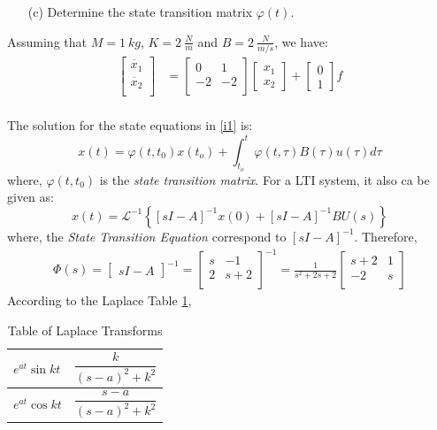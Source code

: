 \documentclass{article}
\begin{document}
\begin{enumerate}[label=(\alpha*)]
\item[(c)] Determine the state transition matrix $\varphi(t)$.
\end{enumerate}

Assuming that $M = 1\:kg$, $K = 2\:\frac{N}{m}$ and $B = 2\:\frac{N}{m/s}$, we have:
\begin{eqnarray*}
\begin{bmatrix} 
	\dot{x_1} \\ 
	\dot{x_2} \\
\end{bmatrix} &= 
\begin{bmatrix} 
    0  &   1 \\
    -2  &  -2\\
\end{bmatrix} 
\begin{bmatrix}
	x_1 \\
	x_2 
\end{bmatrix} +
\begin{bmatrix}
	0 \\ 1
\end{bmatrix}f \\
\end{eqnarray*}

The solution for the state equations in \ref{i1} is:
\begin{equation}
x(t) = \varphi(t,t_0)x(t_o) + \int_{t_o}^{t} \varphi(t,\tau)B(\tau)u(\tau) d\tau
\end{equation}
where, $\varphi(t,t_0)$ is the \textit{state transition matrix}. For a LTI system, it also ca be given as:
\begin{equation}
x(t) = \mathcal{L}^{-1} \left\lbrace \left[sI-A \right]^{-1}x(0) + \left[sI-A \right]^{-1}BU(s) \right\rbrace
\end{equation}\label{xt}
where, the \textit{State Transition Equation} correspond to $ \left[sI-A \right]^{-1} $. Therefore, 
\begin{eqnarray*}
\varPhi(s) =
\begin{bmatrix} 
sI-A
\end{bmatrix}^{-1} = 
\begin{bmatrix} 
    s  &   -1 \\
    2  &  s+2\\
\end{bmatrix} ^{-1} = \frac{1}{s^2+ 2s+ 2}
\begin{bmatrix}
    s+2 & 1	\\
    -2  & s \\
\end{bmatrix}
\end{eqnarray*}
According to the Laplace Table \ref{laplace}, 
\begin{table}[h]
\centering
\caption{Table of Laplace Transforms}
\label{laplace}
\begin{tabular}{|l|l|}
\hline
$e^{at}\sin kt$ & $\dfrac{k}{(s-a)^2+k^2}$  \\ \hline
$e^{at}\cos kt$ & $\dfrac{s-a}{(s-a)^2+k^2}$ \\ \hline
\end{tabular}
\end{table}
\end{document}
